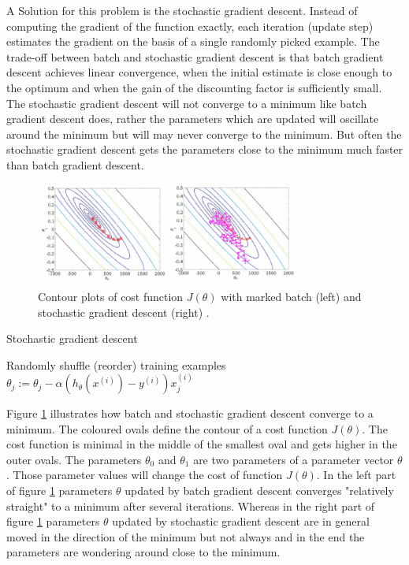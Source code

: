 \documentclass[conference]{IEEEtran}
\begin{document}
A Solution for this problem is the stochastic gradient descent. Instead of computing the gradient of the function exactly, each iteration (update step) estimates the gradient on the basis of a single randomly picked example. The trade-off between batch and stochastic gradient descent is that batch gradient descent achieves linear convergence, when the initial estimate is close enough to the optimum and when the gain of the discounting factor is sufficiently small. The stochastic gradient descent will not converge to a minimum like batch gradient descent does, rather the parameters which are updated will oscillate around the minimum but will may never converge to the minimum. But often the stochastic gradient descent gets the parameters close to the minimum much faster than batch gradient descent. \\

\begin{figure}[!t]
\centering
\includegraphics[width=3.5in]{gradient_plots}
\caption{Contour plots of cost function $J(\theta)$ with marked batch (left) and stochastic gradient descent (right) \cite{ng_2017}.}
\label{fig:gradient_plots}
\end{figure}

\begin{algorithm}
\caption{Stochastic gradient descent \cite{ng_2017}} \label{alg:stochastic gradient descent}
\begin{algorithmic}
\STATE Randomly shuffle (reorder) training examples
\REPEAT
{}
	\STATE $\theta_j := \theta_j - \alpha (h_\theta(x^{(i)}) - y^{(i)}) x^{(i)}_j$
	\ENDFOR
\ENDFOR
{}


\end{algorithmic}
\end{algorithm}

Figure \ref{fig:gradient_plots} illustrates how batch and stochastic gradient descent converge to a minimum. The coloured ovals define the contour of a cost function $J(\theta)$. The cost function is minimal in the middle of the smallest oval and gets higher in the outer ovals. The parameters $\theta_0$ and $\theta_1$ are two parameters of a parameter vector $\theta$. Those parameter values will change the cost of function $J(\theta)$. In the left part of figure \ref{fig:gradient_plots} parameters $\theta$ updated by batch gradient descent converges "relatively straight" to a minimum after several iterations. Whereas in the right part of figure \ref{fig:gradient_plots} parameters $\theta$ updated by stochastic gradient descent are in general moved in the direction of the minimum but not always and in the end the parameters are wondering around close to the minimum. \\
\end{document}
